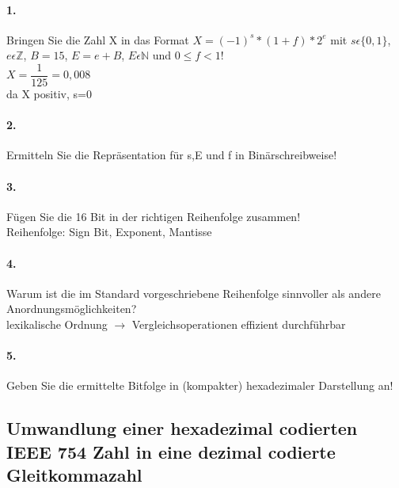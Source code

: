 \documentclass[paper=a4, fontsize=11pt]{scrartcl}
\numberwithin{equation}{section}
\numberwithin{figure}{section}
\numberwithin{table}{section}
\begin{document}
\paragraph{1.}
Bringen Sie die Zahl X in das Format $X=(-1)^{s}*(1+f)*2^{e}$ mit $s \epsilon \{0,1 \}$, $e \epsilon \mathbb{Z}$, $B=15$, $E=e+B$, $E \epsilon \mathbb{N}$ und $0 \leqslant f < 1$! \\

$X=\dfrac{1}{125}=0,008$ \\
da X positiv, s=0 \\

\paragraph{2.}
Ermitteln Sie die Repräsentation für s,E und f in Binärschreibweise! \\

\paragraph{3.}
Fügen Sie die 16 Bit in der richtigen Reihenfolge zusammen! \\

Reihenfolge: Sign Bit, Exponent, Mantisse \\

\paragraph{4.}
Warum ist die im Standard vorgeschriebene Reihenfolge sinnvoller als andere Anordnungsmöglichkeiten? \\

lexikalische Ordnung $\rightarrow$ Vergleichsoperationen effizient durchführbar

\paragraph{5.}
Geben Sie die ermittelte Bitfolge in (kompakter) hexadezimaler Darstellung an! \\


\subsection{Umwandlung einer hexadezimal codierten IEEE 754 Zahl in eine dezimal codierte Gleitkommazahl}
\end{document}

